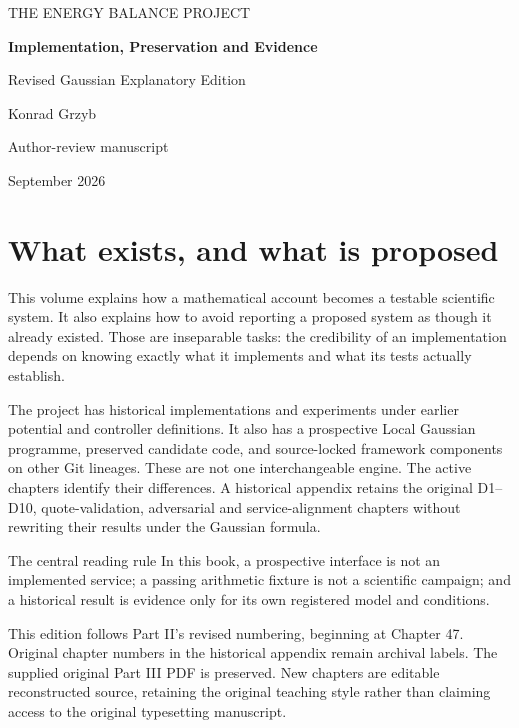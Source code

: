 \begin{titlepage}
\color{navy}\sffamily\raggedright\vspace*{30pt}
{\large THE ENERGY BALANCE PROJECT\par}\vspace{30pt}
{\fontsize{32}{38}\selectfont\bfseries Implementation, Preservation and Evidence\par}
\vspace{20pt}{\Large Part III\par}\vspace{12pt}
{\large Revised Gaussian Explanatory Edition\par}\vfill
{\large Konrad Grzyb\par}\vspace{12pt}
{\normalsize Author-review manuscript\par September 2026\par}
\end{titlepage}
\chapter*{What exists, and what is proposed}
This volume explains how a mathematical account becomes a testable scientific
system. It also explains how to avoid reporting a proposed system as though
it already existed. Those are inseparable tasks: the credibility of an
implementation depends on knowing exactly what it implements and what its
tests actually establish.

The project has historical implementations and experiments under earlier
potential and controller definitions. It also has a prospective Local
Gaussian programme, preserved candidate code, and source-locked framework
components on other Git lineages. These are not one interchangeable engine.
The active chapters identify their differences. A historical appendix retains
the original D1--D10, quote-validation, adversarial and service-alignment
chapters without rewriting their results under the Gaussian formula.

\begin{lawbox}{The central reading rule}
In this book, a prospective interface is not an implemented service; a passing
arithmetic fixture is not a scientific campaign; and a historical result is
evidence only for its own registered model and conditions.
\end{lawbox}

This edition follows Part II's revised numbering, beginning at Chapter 47.
Original chapter numbers in the historical appendix remain archival labels.
The supplied original Part III PDF is preserved. New chapters are editable
reconstructed source, retaining the original teaching style rather than
claiming access to the original typesetting manuscript.

